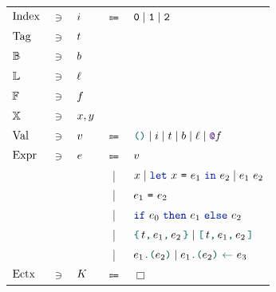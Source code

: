 \begin{figure}[tp]
    \begin{tabular}{lclcl}
            $\datalangIdx[]$
            & $\ni$ &
            $\datalangIdx$
            & $\Coloneqq$ &
            $\texttt{0} \mid \texttt{1} \mid \texttt{2}$
        \\
            $\datalangTag[]$
            & $\ni$ &
            $\datalangTag$
        \\
            $\datalangBool[]$
            & $\ni$ &
            $\datalangBool$
    	\\
    		$\datalangLoc[]$
    		& $\ni$ &
    		$\datalangLoc$
        \\
            $\datalangFn[]$
            & $\ni$ &
            $\datalangFn$
        \\
            $\datalangVar[]$
            & $\ni$ &
            $\datalangVar, \datalangVarTwo$
    	\\
            $\datalangVal[]$
            & $\ni$ &
            $\datalangVal$
            & $\Coloneqq$ &
            $\datalangUnit \mid \datalangIdx \mid \datalangTag \mid \datalangBool \mid \datalangLoc \mid \datalangFnptr{\datalangFn}$
        \\
            $\datalangExpr[]$
            & $\ni$ &
            $\datalangExpr$
            & $\Coloneqq$ &
            $\datalangVal$
        \\
            &&
            & | &
            $\datalangVar \mid \datalangLet{\datalangVar}{\datalangExpr_1}{\datalangExpr_2} \mid \datalangCall{\datalangExpr_1}{\datalangExpr_2}$
        \\
            &&
            & | &
            $\datalangEq{\datalangExpr_1}{\datalangExpr_2}$
        \\
            &&
            & | &
            $\datalangIf{\datalangExpr_0}{\datalangExpr_1}{\datalangExpr_2}$
        \\
            &&
            & | &
            $\datalangBlock{\datalangTag}{\datalangExpr_1}{\datalangExpr_2} \mid \datalangBlockDet{\datalangTag}{\datalangExpr_1}{\datalangExpr_2}$
        \\
            &&
            & | &
            $\datalangLoad{\datalangExpr_1}{\datalangExpr_2} \mid \datalangStore{\datalangExpr_1}{\datalangExpr_2}{\datalangExpr_3}$
        \\
            $\datalangEctx[]$
            & $\ni$ &
            $\datalangEctx$
            & $\Coloneqq$ &
            $\Box$
        \\

\end{tabular}
\end{figure}

